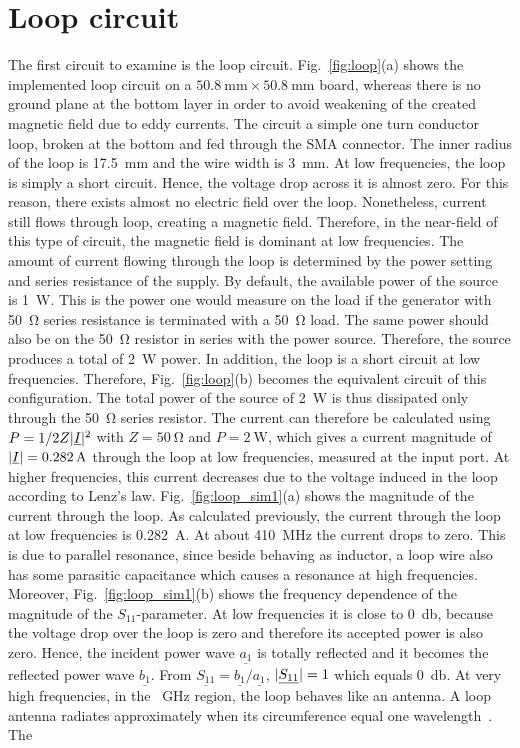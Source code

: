 \section{Loop circuit}
The first circuit to examine is the loop circuit. Fig.~\ref{fig:loop}(a) shows the implemented loop circuit on a $\SI{50.8}{\milli\meter} \times \SI{50.8}{\milli\meter}$ board, whereas there is no ground plane at the bottom layer in order to avoid weakening of the created magnetic field due to eddy currents. The circuit a simple one turn conductor loop, broken at the bottom and fed through the SMA connector. The inner radius of the loop is \SI{17.5}{\milli\meter} and the wire width is \SI{3}{\milli\meter}. At low frequencies, the loop is simply a short circuit. Hence, the voltage drop across it is almost zero. For this reason, there exists almost no electric field over the loop. Nonetheless, current still flows through loop, creating a magnetic field. Therefore, in the near-field of this type of circuit, the magnetic field is dominant at low frequencies. The amount of current flowing through the loop is determined by the power setting and series resistance of the supply. By default, the available power of the source is \SI{1}{\watt}. This is the power one would measure on the load if the generator with \SI{50}{\ohm} series resistance is terminated with a \SI{50}{\ohm} load. The same power should also be on the \SI{50}{\ohm} resistor in series with the power source. Therefore, the source produces a total of \SI{2}{\watt} power. In addition, the loop is a short circuit at low frequencies. Therefore, Fig.~\ref{fig:loop}(b) becomes the equivalent circuit of this configuration. The total power of the source of \SI{2}{\watt} is thus dissipated only through the \SI{50}{\ohm} series resistor. The current can therefore be calculated using $P = 1/2Z\lvert\underline{I}\rvert^2$ with $Z = \SI{50}{\ohm}$ and $P = \SI{2}{\watt}$, which gives a current magnitude of $\lvert\underline{I}\rvert = \SI{0.282}{\ampere}$ through the loop at low frequencies, measured at the input port. At higher frequencies, this current decreases due to the voltage induced in the loop according to Lenz's law. Fig.~\ref{fig:loop_sim1}(a) shows the magnitude of the current through the loop. As calculated previously, the current through the loop at low frequencies is \SI{0.282}{\ampere}. At about \SI{410}{\mega\hertz} the current drops to zero. This is due to parallel resonance, since beside behaving as inductor, a loop wire also has some parasitic capacitance which causes a resonance at high frequencies. Moreover, Fig.~\ref{fig:loop_sim1}(b) shows the frequency dependence of the magnitude of the $S_{11}$-parameter. At low frequencies it is close to \SI{0}{\decibel}, because the voltage drop over the loop is zero and therefore its accepted power is also zero. Hence, the incident power wave $\underline{a_1}$ is totally reflected and it becomes the reflected power wave $\underline{b_1}$. From $\underline{S_{11}} = \underline{b_1}/\underline{a_1}$, $\lvert\underline{S_{11}}\rvert = 1$ which equals \SI{0}{\decibel}. At very high frequencies, in the \SI{}{\giga\hertz} region, the loop behaves like an antenna. A loop antenna radiates approximately when its circumference equal one wavelength~\cite{balanis}. The 